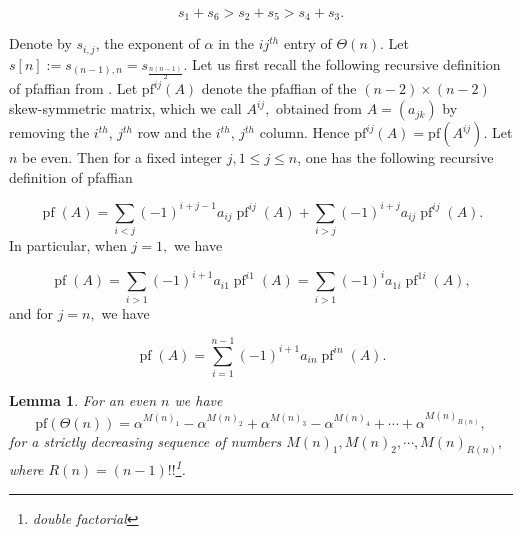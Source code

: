 \documentclass[9pt, BCOR=2mm]{amsart}
\numberwithin{equation}{section}
\numberwithin{equation}{section}
\newtheorem{lemma}[theorem]{Lemma}
\begin{document}
$$s_1+s_6>s_2+s_5>s_4+s_3.$$

Denote by $s_{i,j}$, the exponent of $\alpha$ in the $ij^{th}$ entry of $\Theta(n).$ Let $s[n]:=s_{(n-1),n}=s_{\frac{n(n-1)}{2}}.$
Let us first recall the following recursive definition of pfaffian from \cite[Page 116]{FP98}. Let $\mathrm{pf}^{i j}(A)$ denote the pfaffian of the $(n-2) \times (n-2)$ skew-symmetric matrix, which we call $A^{ij},$ obtained from $A=(a_{jk})$ by removing the $i^{t h}$, $j^{t h}$ row and the $i^{t h}$, $j^{t h}$ column. Hence $\mathrm{pf}^{i j}(A)=\mathrm{pf}(A^{ij}).$ Let $n$ be even. Then for a fixed integer $j, 1 \leq j \leq n$, one has the following recursive definition of pfaffian

$$
\operatorname{pf}(A)=\sum_{i<j}(-1)^{i+j-1} a_{i j} \operatorname{pf}^{i j}(A)+\sum_{i>j}(-1)^{i+j} a_{i j} \operatorname{pf}^{i j}(A).
$$
In particular, when $j=1,$ we have

\begin{equation}\label{eq:pfaffian_recursive_1}
\operatorname{pf}(A)=\sum_{i>1}(-1)^{i+1} a_{i 1} \operatorname{pf}^{i 1}(A)=\sum_{i>1}(-1)^{i} a_{1i} \operatorname{pf}^{1 i}(A),
\end{equation}
and for $j=n,$ we have

\begin{equation}\label{eq:pfaffian_recursive}
\operatorname{pf}(A)=\sum_{i=1}^{n-1}(-1)^{i+1} a_{i n} \operatorname{pf}^{i n}(A).	
\end{equation}



	
	
		
	\begin{lemma}\label{lem:pfaffian_incresing} For an even $n$ we have
	$$\mathrm{pf}(\Theta(n))=\alpha^{M(n)_1}-\alpha^{M(n)_2}+\alpha^{M(n)_3}-\alpha^{M(n)_4}+\cdots +\alpha^{M(n)_{R(n)}},$$ for a strictly decreasing sequence of numbers  $M(n)_1,M(n)_2,\cdots, M(n)_{R(n)},$ where $R(n)=(n-1)!!$\footnote{double factorial}.
	\end{lemma}
	
\end{document}

